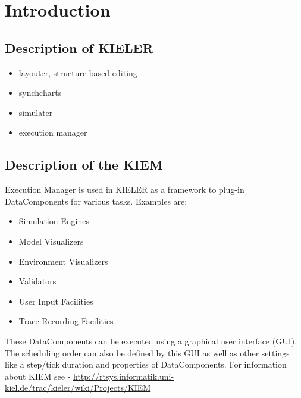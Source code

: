 

\chapter{Introduction}
\label{chapter:introduction}
\section{Description of KIELER}
\label{sec:intro/Kieler}
\begin{itemize}
 \item layouter, structure based editing
 \item synchcharts
 \item simulater
 \item execution manager
\end{itemize}
\section{Description of the KIEM}
\label{sec:intro/Kiem}
Execution Manager is used in KIELER as a framework to plug-in DataComponents for various tasks. Examples are:
\begin{itemize}
 \item Simulation Engines
 \item Model Visualizers
 \item Environment Visualizers
 \item Validators
 \item User Input Facilities
 \item Trace Recording Facilities 
\end{itemize}

These DataComponents can be executed using a graphical user interface (GUI). 
The scheduling order can also be defined by this GUI as well as other settings like a step/tick duration and properties of DataComponents.
For information about \ac{KIEM} see - \url{http://rtsys.informatik.uni-kiel.de/trac/kieler/wiki/Projects/KIEM}
